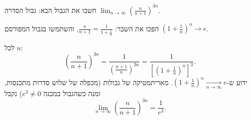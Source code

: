 
\begin{question}
חשבו את הגבול הבא:
גבול הסדרה $\displaystyle \lim_{n\to\infty}\left(\frac{n}{n+1}\right)^{3n}$.
\end{question}

\begin{hint}
הפכו את השבר: $\frac{n}{n+1}=\frac{1}{1+\frac1n}$, והשתמשו בגבול המפורסם $\left(1+\frac1n\right)^n\to e$.
\end{hint}

\begin{solution}
לכל $n$:
\[ \left(\frac{n}{n+1}\right)^{3n}=\frac{1}{\left(\frac{n+1}{n}\right)^{3n}}=\frac{1}{\left[\left(1+\frac1n\right)^{n}\right]^{3}}. \]
ידוע ש-$\left(1+\frac1n\right)^n\xrightarrow[n\to\infty]{} e$. מאריתמטיקה של גבולות (מכפלה של שלוש סדרות מתכנסות, ומנה כשהגבול במכנה $e^3\neq 0$) נקבל
\[ \lim_{n\to\infty}\left(\frac{n}{n+1}\right)^{3n}=\frac{1}{e^3}. \]
\end{solution}
